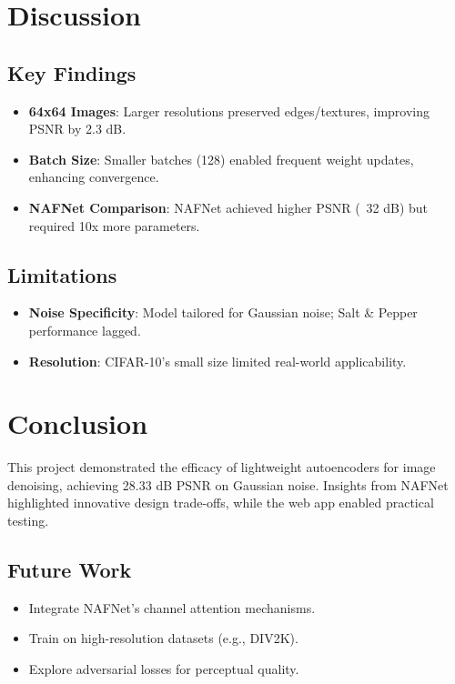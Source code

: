 \documentclass[final]{article}
\begin{document}
\section{Discussion}

\subsection{Key Findings}
\begin{itemize}
    \item \textbf{64x64 Images}: Larger resolutions preserved edges/textures, improving PSNR by 2.3 dB.
    \item \textbf{Batch Size}: Smaller batches (128) enabled frequent weight updates, enhancing convergence.
    \item \textbf{NAFNet Comparison}: NAFNet achieved higher PSNR (~32 dB) but required 10x more parameters.
\end{itemize}

\subsection{Limitations}
\begin{itemize}
    \item \textbf{Noise Specificity}: Model tailored for Gaussian noise; Salt \& Pepper performance lagged.
    \item \textbf{Resolution}: CIFAR-10’s small size limited real-world applicability.
\end{itemize}

\section{Conclusion}
This project demonstrated the efficacy of lightweight autoencoders for image denoising, achieving 28.33 dB PSNR on Gaussian noise. Insights from NAFNet highlighted innovative design trade-offs, while the web app enabled practical testing.

\subsection{Future Work}
\begin{itemize}
    \item Integrate NAFNet’s channel attention mechanisms.
    \item Train on high-resolution datasets (e.g., DIV2K).
    \item Explore adversarial losses for perceptual quality.
\end{itemize}
\end{document}
